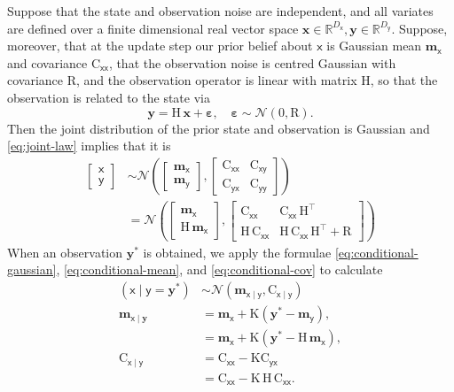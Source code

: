 \documentclass[wcp]{jmlr} %
\newcommand{\vv}[1]{\boldsymbol{#1}}
\newcommand{\mm}[1]{\mathrm{#1}}
\newcommand{\rv}[1]{\mathsf{#1}}
\newcommand{\vrv}[1]{\vv{\rv{#1}}}
\newcommand{\Normal}{\mathcal{N}}
\newcommand{\gvn}{\mid}
\begin{document}
Suppose that the state and observation noise are independent, and all variates are defined over a finite dimensional real vector space
$\vv{x}\in\mathbb{R}^{D_{\vrv{x}}}, \vv{y}\in \mathbb{R}^{D_{\vrv{y}}}.$
Suppose, moreover, that at the update step our prior belief about $\vrv{x}$ is Gaussian mean \(\vv{m}_{\vrv{x}}\) and covariance \(\mm{C}_{\vrv{xx}}\), that the observation noise is centred Gaussian with covariance \(\mm{R}\), and the observation operator is linear with matrix \(\mm{H}\), so that the observation is related to the state via
\[
\vv{y} = \mm{H}\,\vv{x} + \vv{\varepsilon}, \quad \vv{\varepsilon} \sim \mathcal{N}(0,\mm{R}).
\]
Then the joint distribution of the prior state and observation is Gaussian and \eqref{eq:joint-law} implies that it is
\begin{align}
\begin{bmatrix}
\vrv{x} \\
\vrv{y}
\end{bmatrix}
&\sim \mathcal{N}\!\left(
    \begin{bmatrix}
    \vv{m}_{\vrv{x}} \\
    \vv{m}_{\vrv{y}}
    \end{bmatrix},
    \begin{bmatrix}
    \mm{C}_{\vrv{xx}} & \mm{C}_{\vrv{xy}} \\
    \mm{C}_{\vrv{yx}} & \mm{C}_{\vrv{yy}}
    \end{bmatrix}
    \right)\\
&=\mathcal{N}\!\left(
    \begin{bmatrix}
    \vv{m}_{\vrv{x}} \\
    \mm{H}\,\vv{m}_{\vrv{x}}
    \end{bmatrix},
    \begin{bmatrix}
    \mm{C}_{\vrv{xx}} & \mm{C}_{\vrv{xx}}\,\mm{H}^\top \\
    \mm{H}\,\mm{C}_{\vrv{xx}} & \mm{H}\,\mm{C}_{\vrv{xx}}\,\mm{H}^\top + \mm{R}
    \end{bmatrix}
    \right)
\end{align}
When an observation \(\vv{y}^*\) is obtained, we apply the formulae
\eqref{eq:conditional-gaussian}, \eqref{eq:conditional-mean}, and \eqref{eq:conditional-cov} to calculate
\begin{align}
\left(\vrv{x} \gvn \vrv{y} {=} \vv{y}^*\right)
&\sim\Normal(\vv{m}_{\vrv{x}\gvn\vrv{y}}, \mm{C}_{\vrv{x}\gvn\vrv{y}})\\
\vv{m}_{\vrv{x}\gvn \vv{y}}
&= \vv{m}_{\vrv{x}} + \mm{K} \left(\vv{y}^* - \vv{m}_{\vrv{y}}\right),\\
&= \vv{m}_{\vrv{x}} + \mm{K} \left(\vv{y}^* - \mm{H}\,\vv{m}_{\vrv{x}}\right),\\
\mm{C}_{\vrv{x}\gvn\vrv{y}}
&= \mm{C}_{\vrv{xx}} - \mm{K}\mm{C}_{\vrv{yx}}\\
&= \mm{C}_{\vrv{xx}} - \mm{K}\,\mm{H}\,\mm{C}_{\vrv{xx}}.
\end{align}
\end{document}
